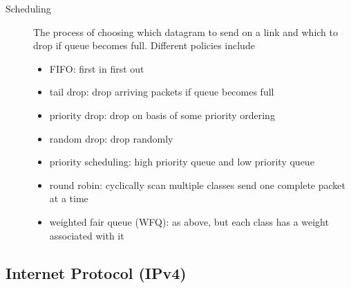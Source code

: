 \documentclass{article}
\begin{document}
\begin{description}
    \item[Scheduling] The process of choosing which datagram to send on a link and which to drop if
    queue becomes full. Different policies include
    \begin{itemize}
        \item FIFO: first in first out
        \item tail drop: drop arriving packets if queue becomes full
        \item priority drop: drop on basis of some priority ordering
        \item random drop: drop randomly
        \item priority scheduling: high priority queue and low priority queue
        \item round robin: cyclically scan multiple classes send one complete packet at a time
        \item weighted fair queue (WFQ): as above, but each class has a weight associated with it
    \end{itemize}
\end{description}

\subsection*{Internet Protocol (IPv4)}
\end{document}
